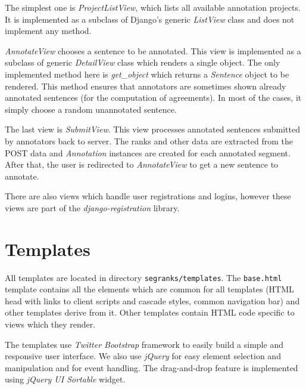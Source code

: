 The simplest one is \textit{ProjectListView}, which lists all available
annotation projects. It is implemented as a subclass of Django's generic
\textit{ListView} class and does not implement any method.

\textit{AnnotateView} chooses a sentence to be annotated. This view is
implemented as a subclass of generic \textit{DetailView} class which renders a
single object. The only implemented method here is \textit{get\_object} which
returns a \textit{Sentence} object to be rendered. This method ensures that
annotators are sometimes shown already annotated sentences (for the computation
of agreements). In most of the cases, it simply choose a random unannotated
sentence.

The last view is \textit{SubmitView}. This view processes annotated sentences
submitted by annotators back to server. The ranks and other data are extracted
from the POST data and \textit{Annotation} instances are created for each
annotated segment. After that, the user is redirected to \textit{AnnotateView}
to get a new sentence to annotate.

There are also views which handle user registrations and logins, however these
views are part of the \textit{django-registration} library.

\section{Templates}

All templates are located in directory \texttt{segranks/templates}. The
\texttt{base.html} template contains all the elements which are common for all
templates (HTML head with links to client scripts and cascade styles, common
navigation bar) and other templates derive from it. Other templates contain
HTML code specific to views which they render.

The templates use \textit{Twitter Bootstrap} framework to easily build a simple
and responsive user interface. We also use \textit{jQuery} for easy element
selection and manipulation and for event handling. The drag-and-drop feature is
implemented using \textit{jQuery UI Sortable} widget.




